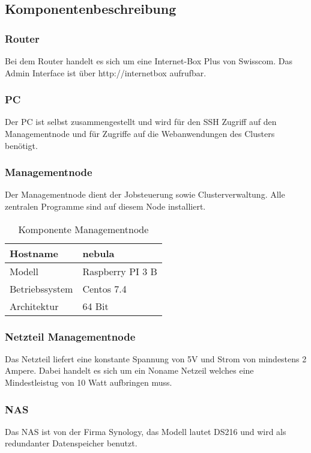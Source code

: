 \subsection{Komponentenbeschreibung}
\subsubsection{Router}

Bei dem Router handelt es sich um eine Internet-Box Plus von Swisscom. Das Admin Interface ist über http://internetbox aufrufbar.

\subsubsection{PC}
Der PC ist selbst zusammengestellt und wird für den SSH Zugriff auf den Managementnode und für Zugriffe auf die Webanwendungen des Clusters benötigt.

\subsubsection{Managementnode}
Der Managementnode dient der Jobsteuerung sowie Clusterverwaltung. Alle zentralen Programme sind auf diesem Node installiert.

\begin{table}[H]
\centering
\begin{tabular}{|l|l|}
\hline
Hostname & nebula \\\hline
Modell & Raspberry PI 3 B\\\hline
Betriebssystem & Centos 7.4 \\\hline
Architektur & 64 Bit \\\hline
\end{tabular}
\caption{Komponente Managementnode}
\end{table}

\subsubsection{Netzteil Managementnode}
Das Netzteil liefert eine konstante Spannung von 5V und Strom von mindestens 2 Ampere. Dabei handelt es sich um ein Noname Netzeil welches eine Mindestleistug von 10 Watt aufbringen muss.

\subsubsection{NAS}
Das NAS ist von der Firma Synology, das Modell lautet DS216 und wird als redundanter Datenspeicher benutzt.

